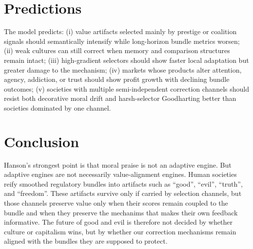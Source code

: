 \documentclass[11pt]{article}
\begin{document}
\section{Predictions}
The model predicts: 
(i) value artifacts selected mainly by prestige or coalition signals should semantically intensify while long-horizon bundle metrics worsen; 
(ii) weak cultures can still correct when memory and comparison structures remain intact; 
(iii) high-gradient selectors should show faster local adaptation but greater damage to the mechanism; 
(iv) markets whose products alter attention, agency, addiction, or trust should show profit growth with declining bundle outcomes; (v) societies with multiple semi-independent correction channels should resist both decorative moral drift and harsh-selector Goodharting better than societies dominated by one channel.

\section{Conclusion}
Hanson's strongest point is that moral praise is not an adaptive engine. 
But adaptive engines are not necessarily value-alignment engines. 
Human societies reify smoothed regulatory bundles into artifacts such as ``good'', ``evil'', ``truth'', and ``freedom''. 
These artifacts survive only if carried by selection channels, but those channels preserve value only when 
their scores remain coupled to the bundle and when they preserve the mechanims that makes their own feedback informative. 
The future of good and evil is therefore not decided by whether culture or capitalism wins, but by whether our correction mechanisms remain aligned with the bundles they are supposed to protect.



\end{document}
